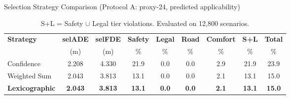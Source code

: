 \begin{table}[t]
\centering
\caption{Selection Strategy Comparison (Protocol A: proxy-24, predicted applicability)}
\label{tab:detailed_results}
\begin{tabular}{lcccccccc}
\toprule
\textbf{Strategy} & \textbf{selADE} & \textbf{selFDE} & \textbf{Safety} & \textbf{Legal} & \textbf{Road} & \textbf{Comfort} & \textbf{S+L} & \textbf{Total} \\
 & (m) & (m) & \% & \% & \% & \% & \% & \% \\
\midrule
Confidence & 2.208 & 4.330 & 21.9 & 0.0 & 0.0 & 2.9 & 21.9 & 23.9 \\
Weighted Sum & 2.043 & 3.813 & 13.1 & 0.0 & 0.0 & 2.1 & 13.1 & 15.0 \\
\textbf{Lexicographic} & \textbf{2.043} & \textbf{3.813} & \textbf{13.1} & \textbf{0.0} & \textbf{0.0} & \textbf{2.1} & \textbf{13.1} & \textbf{15.0} \\
\bottomrule
\end{tabular}
\vspace{1mm}
\caption*{\footnotesize S+L = Safety $\cup$ Legal tier violations.
Evaluated on 12,800 scenarios.}
\end{table}
